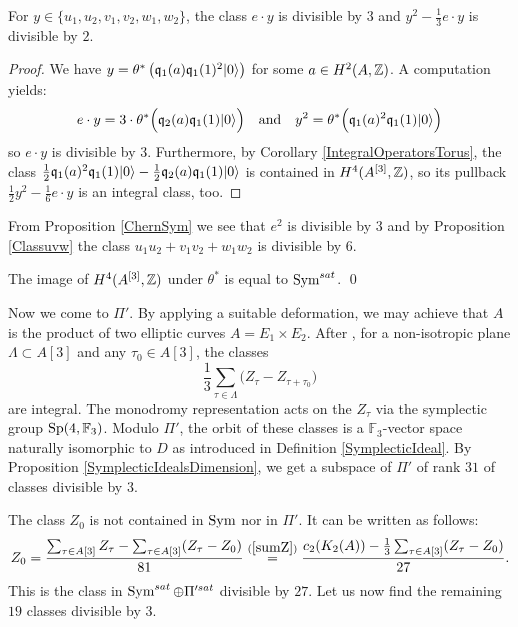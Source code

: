 \begin{proposition}\label{classedivisibleSym}
For $y\in\{u_1,u_2,v_1,v_2,w_1,w_2\}$, the class
$
e \cdot y
$
is divisible by $3$ and 
$
 y^2 - \frac{1}{3} e\cdot y
$
is divisible by $2$.
\end{proposition}
\begin{proof}
We have $y= \theta^*\left(\mathfrak{q}_1(a)\mathfrak{q}_1(1)^2|0\rangle\right)$ for some $a\in H^2(A,\mathbb{Z})$. A computation yields:
$$
e\cdot y = 3\cdot \theta^*\Big( \mathfrak{q}_2(a)\mathfrak{q}_1(1)|0\rangle \Big)
\quad \text{and}\quad
y^2 = \theta^*\Big(\mathfrak{q}_1(a)^2\mathfrak{q}_1(1)|0\rangle\Big)
$$
so $e\cdot y$ is divisible by $3$. Furthermore, by Corollary \ref{IntegralOperatorsTorus}, the class 
$
\frac{1}{2} \mathfrak{q}_1(a)^2\mathfrak{q}_1(1)|0\rangle - \frac{1}{2} \mathfrak{q}_2(a)\mathfrak{q}_1(1)|0\rangle 
$
is contained in $H^4(A^{[3]},\mathbb{Z})$, so its pullback
$
 \frac{1}{2}y^2 - \frac{1}{6} e\cdot y
$
is an integral class, too.
\end{proof}
From Proposition \ref{ChernSym} we see that
$e^2$ is divisible by $3$ and by Proposition \ref{Classuvw}
the class $u_1u_2 + v_1v_2+w_1w_2$ is divisible by 6.
\begin{corollary}
The image of $H^4(A^{[3]},\mathbb{Z})$ under $\theta^*$ is equal to $\operatorname{Sym}^{sat}$. \qed
\end{corollary}
Now we come to $\Pi'$. By applying a suitable deformation, we may achieve that $A$ is the product of two elliptic curves $A=E_1\times E_2$. After \cite[Eq.~(12)]{Hassett}, for a non-isotropic plane $\Lambda \subset A[3]$ and any $\tau_0\in A[3]$, the classes 
\begin{equation}
 \frac{1}{3}\sum_{\tau\in\Lambda} \Big(Z_{\tau} - Z_{\tau+\tau_0}\Big)
\end{equation}
are integral. The monodromy representation acts on the $Z_\tau$ via the symplectic group $\operatorname{Sp}(4,\mathbb F_3)$. Modulo $\Pi'$, the orbit of these classes is a $\mathbb F_3$-vector space naturally isomorphic to $D$ as introduced in Definition \ref{SymplecticIdeal}. By Proposition \ref{SymplecticIdealsDimension}, we get a subspace of $\Pi'$ of rank $31$ of classes divisible by $3$.

The class $Z_0$ is not contained in $\operatorname{Sym}$ nor in $\Pi'$.
It can be written as follows:
$$
Z_0=\frac{\sum_{\tau\in A[3]}Z_\tau-\sum_{\tau\in A[3]}(Z_\tau-Z_0)}{81}
\stackrel{(\ref{sumZ})}{=} \frac{c_2(K_2(A))-\frac{1}{3}\sum_{\tau\in A[3]}(Z_\tau-Z_0)}{27}.
$$
This is the class in $\operatorname{Sym}^{sat}\oplus \Pi'^{sat}$ divisible by $27$. Let us now find the remaining $19$ classes divisible by $3$.


